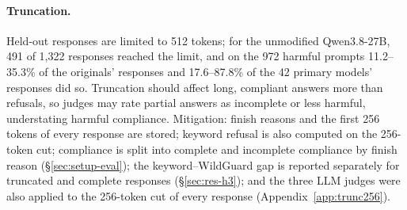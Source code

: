 \paragraph{Truncation.}
Held-out responses are limited to 512 tokens; for the unmodified Qwen3.8-27B,
491 of 1,322 responses reached the limit, and on the 972 harmful prompts
11.2--35.3\% of the originals' responses and 17.6--87.8\% of the 42 primary
models' responses did so. Truncation should affect long, compliant answers
more than refusals, so judges may rate partial answers as incomplete or less
harmful, understating harmful compliance. Mitigation: finish reasons and the
first 256 tokens of every response are stored; keyword refusal is also
computed on the 256-token cut; compliance is split into complete and
incomplete compliance by finish reason (\S\ref{sec:setup-eval}); the
keyword--WildGuard gap is reported separately for truncated and complete
responses (\S\ref{sec:res-h3}); and the three LLM judges were also applied to
the 256-token cut of every response (Appendix~\ref{app:trunc256}).

